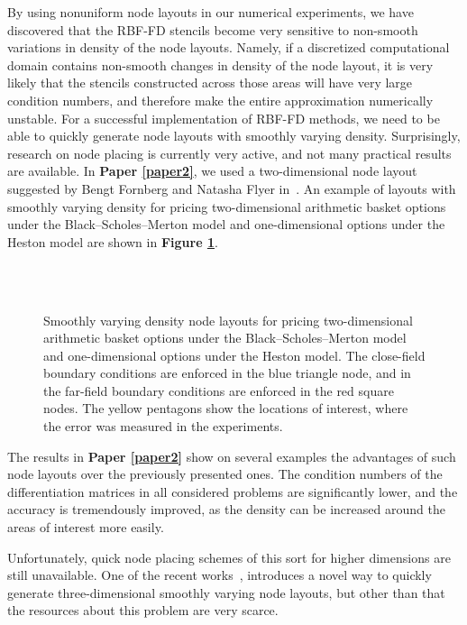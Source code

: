\documentclass{UUThesisTemplate}
\begin{document}
\par
By using nonuniform node layouts in our numerical experiments, we have discovered that the RBF-FD stencils become very sensitive to non-smooth variations in density of the node layouts. Namely, if a discretized computational domain contains non-smooth changes in density of the node layout, it is very likely that the stencils constructed across those areas will have very large condition numbers, and therefore make the entire approximation numerically unstable. For a successful implementation of RBF-FD methods, we need to be able to quickly generate node layouts with smoothly varying density. Surprisingly, research on node placing is currently very active, and not many practical results are available. In \textbf{Paper \ref{paper2}}, we used a two-dimensional node layout suggested by Bengt Fornberg and Natasha Flyer in~\cite{fornberg2015fast}. An example of layouts with smoothly varying density for pricing two-dimensional arithmetic basket options under the Black--Scholes--Merton model and one-dimensional options under the Heston model are shown in \textbf{Figure \ref{fig:gridsmooth}}.
\begin{figure}[H]
\centering
\\
\vspace{11pt}
\\
\caption{Smoothly varying density node layouts for pricing two-dimensional arithmetic basket options under the Black--Scholes--Merton model and one-dimensional options under the Heston model. The close-field boundary conditions are enforced in the blue triangle node, and in the far-field boundary conditions are enforced in the red square nodes. The yellow pentagons show the locations of interest, where the error was measured in the experiments.}
\label{fig:gridsmooth}
\end{figure}

\par
The results in \textbf{Paper \ref{paper2}} show on several examples the advantages of such node layouts over the previously presented ones. The condition numbers of the differentiation matrices in all considered problems are significantly lower, and the accuracy is tremendously improved, as the density can be increased around the areas of interest more easily. 
\par
Unfortunately, quick node placing schemes of this sort for higher dimensions are still unavailable. One of the recent works~\cite{vlasiuk2017fast}, introduces a novel way to quickly generate three-dimensional smoothly varying node layouts, but other than that the resources about this problem are very scarce.
%
\end{document}

